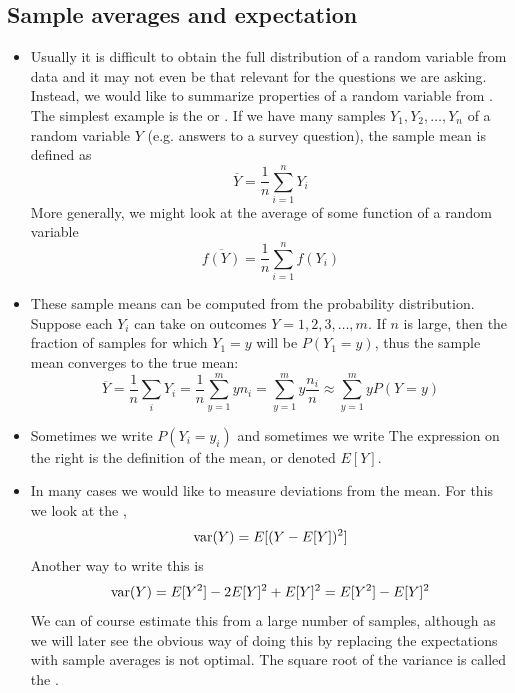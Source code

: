 \subsection{Sample averages and expectation}
\begin{itemize}
\item Usually it is difficult to obtain the full distribution of a random variable from data and it may not even be that relevant for the questions we are asking. Instead, we would like to summarize properties of a random variable from . The simplest example is the  or . 
If we have many samples $Y_1,Y_2,\dots,Y_n$ of a random variable $Y$ (e.g. answers to a survey question), the sample mean is defined as
\begin{equation*}
\overline{Y} = \frac{1}{n}\sum_{i=1}^nY_i
\end{equation*}
More generally, we might look at the average of some function of a random variable 
\begin{equation*}
\overline{f(Y)} = \frac{1}{n}\sum_{i=1}^nf(Y_i)
\end{equation*}
\item  These sample means can be computed from the probability distribution.  Suppose each $Y_i$ can take on outcomes $Y = 1,2,3,\dots,m$. If $n$ is large, then the fraction of samples for which $Y_1= y$ will be $P(Y_1=y)$, thus the sample mean converges to the true mean: 
 \begin{equation*}
\overline{Y} =  \frac{1}{n}\sum_{i}Y_i = \frac{1}{n} \sum_{y=1}^m y n_i=\sum_{y=1}^m y \frac{n_i }{n}\approx  \sum_{y=1}^m y P(Y=y)
\end{equation*}
\item Sometimes we write $P(Y_i = y_i)$ and sometimes we write 
The expression on the right is the definition of the mean, or  denoted $E[Y]$.
\item In many cases we would like to measure deviations from the mean. For this we look at the ,
\begin{equation*}
{\rm var}(Y) = E[(Y-E[Y])^2]
\end{equation*}
Another way to write this is 
\begin{equation*}
 {\rm var}(Y) = E[Y^2] - 2E[Y]^2 + E[Y]^2 = E[Y^2]-E[Y]^2
\end{equation*}
We can of course estimate this from a large number of samples, although as we will later see the obvious way of doing this by replacing the expectations with sample averages is not optimal. The square root of the variance is called the . 


\end{itemize}
